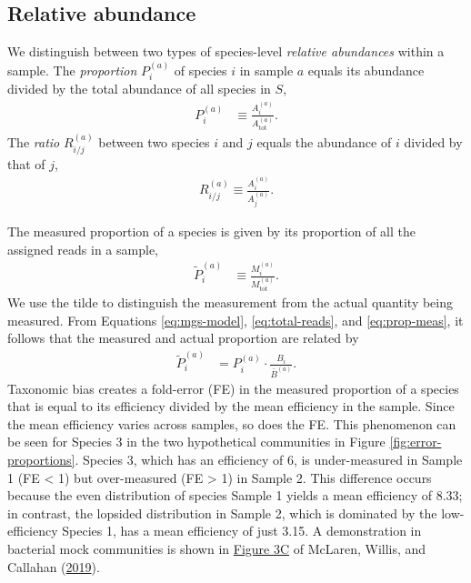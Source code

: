\documentclass[
]{article}
\begin{document}
\hypertarget{relative-abundance}{%
\subsection{Relative abundance}\label{relative-abundance}}

We distinguish between two types of species-level \emph{relative abundances} within a sample.
The \emph{proportion} \(P_{i}^{(a)}\) of species \(i\) in sample \(a\) equals its abundance divided by the total abundance of all species in \(S\),
\begin{align}
  \label{eq:prop}
  P_{i}^{(a)} &\equiv \frac{A_i^{(a)}}{A_{\text{tot}}^{(a)}}.
\end{align}
The \emph{ratio} \(R_{i/j}^{(a)}\) between two species \(i\) and \(j\) equals the abundance of \(i\) divided by that of \(j\),
\begin{align}
  \label{eq:ratio}
  R_{i/j}^{(a)} \equiv \frac{A_i^{(a)}}{A_j^{(a)}}.
\end{align}

The measured proportion of a species is given by its proportion of all the assigned reads in a sample,
\begin{align}
  \label{eq:prop-meas}
  \tilde P_{i}^{(a)} &\equiv \frac{M_i^{(a)}}{M_{\text{tot}}^{(a)}}.
\end{align}
We use the tilde to distinguish the measurement from the actual quantity being measured.
From Equations \eqref{eq:mgs-model}, \eqref{eq:total-reads}, and \eqref{eq:prop-meas}, it follows that the measured and actual proportion are related by
\begin{align}
  \label{eq:prop-error}
  \tilde P_{i}^{(a)} &= P_{i}^{(a)} \cdot \frac{B_i}{\bar B^{(a)}}.
\end{align}
Taxonomic bias creates a fold-error (FE) in the measured proportion of a species that is equal to its efficiency divided by the mean efficiency in the sample.
Since the mean efficiency varies across samples, so does the FE.
This phenomenon can be seen for Species 3 in the two hypothetical communities in Figure \ref{fig:error-proportions}.
Species 3, which has an efficiency of 6, is under-measured in Sample 1 (FE \textless{} 1) but over-measured (FE \textgreater{} 1) in Sample 2.
This difference occurs because the even distribution of species Sample 1 yields a mean efficiency of 8.33; in contrast, the lopsided distribution in Sample 2, which is dominated by the low-efficiency Species 1, has a mean efficiency of just 3.15.
A demonstration in bacterial mock communities is shown in \href{https://doi.org/10.7554/eLife.46923.004}{Figure 3C} of McLaren, Willis, and Callahan (\protect\hyperlink{ref-mclaren2019cons}{2019}).
\end{document}
